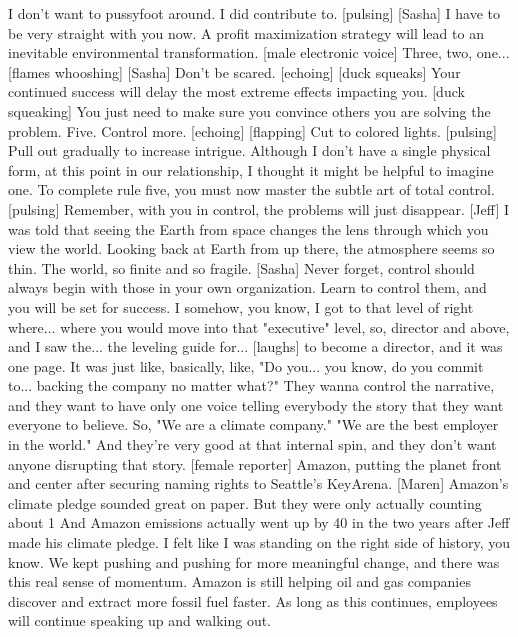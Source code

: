 \documentclass[a4paper]{article}
\begin{document}
	I don't want to pussyfoot around. I did contribute to.
	[pulsing]
	[Sasha] I have to be very straight with you now.
	A profit maximization strategy
	will lead to an inevitable environmental transformation.
	[male electronic voice] Three, two, one...
	[flames whooshing]
	[Sasha] Don't be scared. [echoing]
	[duck squeaks]
	Your continued success will delay the most extreme effects impacting you.
	[duck squeaking]
	You just need to make sure you convince others
	you are solving the problem.
	Five.
	Control more. [echoing]
	[flapping]
	Cut to colored lights.
	[pulsing]
	Pull out gradually to increase intrigue.
	Although I don't have a single physical form,
	at this point in our relationship,
	I thought it might be helpful to imagine one.
	To complete rule five,
	you must now master the subtle art of total control.
	[pulsing]
	Remember, with you in control, the problems will just disappear.
	[Jeff] I was told that seeing the Earth from space
	changes the lens through which you view the world.
	Looking back at Earth from up there,
	the atmosphere seems so thin.
	The world, so finite and so fragile.
	[Sasha] Never forget,
	control should always begin with those
	in your own organization.
	Learn to control them, and you will be set for success.
	I somehow, you know, I got to that level of right
	where... where you would move into that "executive" level,
	so, director and above,
	and I saw the...
	the leveling guide for... [laughs] to become a director, and it was one page.
	It was just like, basically, like,
	"Do you... you know,
	do you commit to...
	backing the company no matter what?"
	They wanna control the narrative,
	and they want to have only one voice telling everybody
	the story that they want everyone to believe.
	So, "We are a climate company."
	"We are the best employer in the world."
	And they're very good at that internal spin,
	and they don't want anyone disrupting that story.
	[female reporter] Amazon, putting the planet front and center
	after securing naming rights to Seattle's KeyArena.
	[Maren] Amazon's climate pledge sounded great on paper.
	But they were only actually counting
	about 1%
	And Amazon emissions actually went up by 40%
	in the two years after Jeff made his climate pledge.
	I felt like I was standing on the right side of history, you know.
	We kept pushing and pushing for more meaningful change,
	and there was this real sense of momentum.
	Amazon is still helping oil and gas companies
	discover and extract more fossil fuel faster.
	As long as this continues, employees will continue speaking up and walking out.
\end{document}
